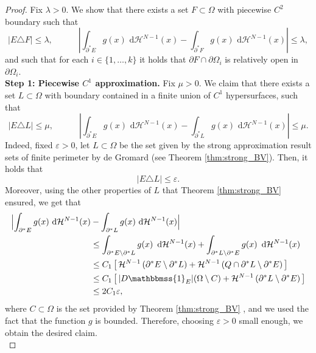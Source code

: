 \documentclass[a4paper, 11pt, reqno]{amsart}
\theoremstyle{plain}
\theoremstyle{definition}
\theoremstyle{remark}
\newcommand{\ca}{\mathbb{1}}
\newcommand{\hno}{{\mathcal H}^{N-1}}
\newcommand{\dd}{\,\mathrm{d}}
\newcommand{\dhno}{\,\dd{\mathcal H}^{N-1}}
\def\ca{\mathbbmss{1}}
\begin{document}
\begin{proof}
Fix $\lambda>0$. We show that there exists a set $F\subset \Omega$ with piecewise $C^2$ boundary such that
\[
|E\triangle F|\leq\lambda,\quad\quad\quad
\left| \int_{\partial^*E} g(x) \dhno(x)
    - \int_{\partial^*F} g(x) \dhno(x) \right| \leq \lambda,
\]
and such that for each $i\in\{1,\dots,k\}$ it holds that $\partial F\cap \partial\Omega_i$ is relatively open in $\partial\Omega_i$.\\

\textbf{Step 1: Piecewise $C^1$ approximation.}
Fix $\mu>0$.
We claim that there exists a set $L\subset\Omega$ with boundary contained in a finite union of $C^1$ hypersurfaces, such that
\[
|E\triangle L|\leq\mu,\quad\quad\quad
\left| \int_{\partial^*E} g(x) \dhno(x)
    - \int_{\partial^*L} g(x) \dhno(x) \right| \leq \mu.
\]
Indeed, fixed $\varepsilon>0$, let $L\subset\Omega$ be the set given by the strong approximation result sets of finite perimeter by de Gromard (see Theorem \ref{thm:strong_BV}).
Then, it holds that
\[
|E\triangle L|\leq\varepsilon.
\]
Moreover, using the other properties of $L$ that Theorem \ref{thm:strong_BV} ensured, we get that
\begin{align*}
\Bigl| \int_{\partial^*E} g(x) \dhno(x)
    &- \int_{\partial^* L} g(x) \dhno(x) \Bigr| \\
&\leq
    \int_{\partial^*E\setminus \partial^* L} g(x)\, \dhno(x) 
    +\int_{\partial^* L \setminus \partial^*E} g(x)\, \dhno(x) \\
&\leq C_1\left[\, \hno\left(\partial^*E\setminus \partial^* L \right)
    + \hno\left( Q\cap \partial^*L \setminus \partial^*E \right) \,\right] \\
&\leq C_1\left[\, |D\ca_E|(\Omega\setminus C )
    + \hno\left(\partial^* L \setminus \partial^*E \right) \,\right] \\
&\leq 2 C_1\varepsilon,
\end{align*}
where $C\subset\Omega$ is the set provided by Theorem \ref{thm:strong_BV} , and we used the fact that the function $g$ is bounded.
Therefore, choosing $\varepsilon>0$ small enough, we obtain the desired claim.\\


\end{proof}
\end{document}
